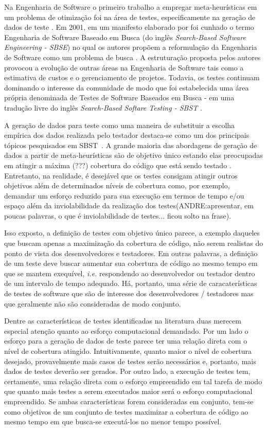 Na Engenharia de Software o primeiro trabalho a empregar meta-heurísticas em um problema de otimização foi na área de testes, especificamente na geração de dados de teste \cite{miller1976automatic}. Em 2001, em um manifesto elaborado por  foi cunhado o termo Engenharia de Software Baseado em Busca (do inglês \textit{Search-Based Software Engineering - SBSE}) no qual os autores propõem a reformulação da Engenharia de Software como um problema de busca \cite{harman2001search}. A estruturação proposta pelos autores provocou a evolução de outras áreas na Engenharia de Software tais como a estimativa de custos e o gerenciamento de projetos. Todavia, os testes continuam dominando o interesse da comunidade de modo que foi estabelecida  uma área própria denominada de Testes de Software Baseados em Busca - em uma tradução livre do inglês \textit{Search-Based Softare Testing - SBST} \cite{harman2012search}.

A geração de dados para teste como uma maneira de substituir a escolha empírica dos dados realizada pelo testador destaca-se como um dos principais tópicos pesquisados em SBST~\cite{mcminn2004search}. A grande maioria das abordagens de geração de dados a partir de meta-heurísticas são de objetivo único estando elas preocupadas em atingir a máxima (???) cobertura do código que está sendo testado \cite{harman2015achievements}. Entretanto, na realidade, é desejável que os testes consigam atingir outros objetivos além de determinados níveis de cobertura como, por exemplo, demandar um esforço reduzido para sua execução em termos de tempo e/ou espaço além da inviolabilidade da realização dos testes\cite{harman2015achievements}(ANDRE:apresentar, em poucas palavras, o que é inviolabilidade de testes... ficou solto na frase).

Isso exposto, a definição de testes com objetivo único parece, a exemplo daqueles que buscam apenas a maximização da cobertura de código, não serem realistas do ponto de vista dos desenvolvedores e testadores. Em outras palavras, a definição de um teste deve buscar aumentar sua cobertura de código ao mesmo tempo em que se mantem exequível, \textit{i.e.} respondendo ao desenvolvedor ou testador dentro de um intervalo de tempo adequado. Há, portanto, uma série de caracaterísticas de testes de software que são de interesse dos desenvolvedores / testadores mas que geralmente não são consideradas de modo conjunto.

Dentre as características de testes identificadas na literatura duas merecem especial atenção quanto ao esforço computacional demandado. Por um lado o esforço para a geração de dados de teste parece ter uma relação direta com o nível de cobertura atingido. Intuitivamente, quanto maior o nível de cobertura desejado, provavelmente mais casos de testes serão necessários e, portanto, mais dados de testes deverão ser gerados. Por outro lado, a execução de testes tem, certamente, uma relação direta com o esforço empreendido em tal tarefa de modo que quanto mais testes a serem executados maior será o esforço computacional empreendido.  Se ambas características forem consideradas em conjunto, tem-se como objetivos de um conjunto de testes maximizar a cobertura de código  ao mesmo tempo em que busca-se executá-los no menor tempo possível.

